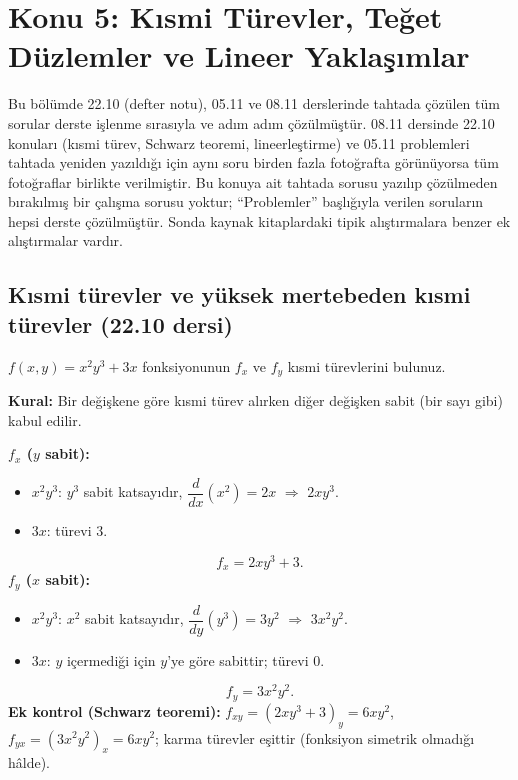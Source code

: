 \section{Konu 5: Kısmi Türevler, Teğet Düzlemler ve Lineer Yaklaşımlar}

Bu bölümde 22.10 (defter notu), 05.11 ve 08.11 derslerinde tahtada çözülen tüm sorular derste işlenme sırasıyla ve adım
adım çözülmüştür. 08.11 dersinde 22.10 konuları (kısmi türev, Schwarz teoremi, lineerleştirme) ve 05.11 problemleri
tahtada yeniden yazıldığı için aynı soru birden fazla fotoğrafta görünüyorsa tüm fotoğraflar birlikte verilmiştir.
Bu konuya ait tahtada sorusu yazılıp çözülmeden bırakılmış bir çalışma sorusu yoktur; ``Problemler'' başlığıyla verilen
soruların hepsi derste çözülmüştür. Sonda kaynak kitaplardaki tipik alıştırmalara benzer ek alıştırmalar vardır.

\subsection{Kısmi türevler ve yüksek mertebeden kısmi türevler (22.10 dersi)}

\begin{soru}
$f(x,y)=x^2y^3+3x$ fonksiyonunun $f_x$ ve $f_y$ kısmi türevlerini bulunuz.
\end{soru}
\begin{cevap}
\textbf{Kural:} Bir değişkene göre kısmi türev alırken diğer değişken sabit (bir sayı gibi) kabul edilir.

\textbf{$f_x$ ($y$ sabit):}
\begin{itemize}
  \item $x^2y^3$: $y^3$ sabit katsayıdır, $\dfrac{d}{dx}(x^2)=2x$ $\Rightarrow$ $2xy^3$.
  \item $3x$: türevi $3$.
\end{itemize}
\[ f_x=2xy^3+3 . \]
\textbf{$f_y$ ($x$ sabit):}
\begin{itemize}
  \item $x^2y^3$: $x^2$ sabit katsayıdır, $\dfrac{d}{dy}(y^3)=3y^2$ $\Rightarrow$ $3x^2y^2$.
  \item $3x$: $y$ içermediği için $y$'ye göre sabittir; türevi $0$.
\end{itemize}
\[ f_y=3x^2y^2 . \]
\textbf{Ek kontrol (Schwarz teoremi):} $f_{xy}=(2xy^3+3)_y=6xy^2$, $f_{yx}=(3x^2y^2)_x=6xy^2$; karma türevler eşittir
(fonksiyon simetrik olmadığı hâlde).
\end{cevap}

